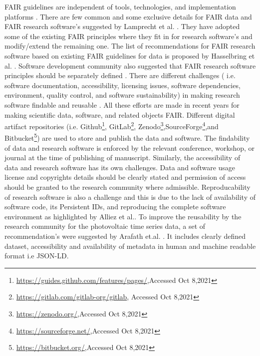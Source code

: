 \documentclass[preprint,12pt]{elsarticle}
\begin{document}
FAIR guidelines are independent of tools, technologies, and implementation platforms \cite{wilkinson2016FAIR}. There are few common and some exclusive details for FAIR data and FAIR research software’s suggested by Lamprecht et al. \cite{lamprecht2020towards}. They have adopted some of the existing FAIR principles where they fit in for research software’s and modify/extend the remaining one. The list of recommendations for FAIR research software based on existing FAIR guidelines for data is proposed by Hasselbring et al. \cite{hasselbring2020FAIR}. Software development community also suggested that FAIR research software principles should be separately defined \cite{gruenpeter2020m2}. There are different challenges ( i.e. software documentation, accessibility, licensing issues, software dependencies, environment, quality control, and software sustainability) in making research software findable and reusable \cite{org2020d2}.
All these efforts are made in recent years for making scientific data, software, and related objects FAIR. Different digital artifact repositories (i.e. Github\footnote{\url{https://guides.github.com/features/pages/},Accessed Oct 8,2021}, GitLab\footnote{\url{https://gitlab.com/gitlab-org/gitlab}, Accessed Oct 8,2021}, Zenodo\footnote{\url{https://zenodo.org/},Accessed Oct 8,2021},SourceForge\footnote{\url{https://sourceforge.net/},Accessed Oct 8,2021},and Bitbucket\footnote{\url{https://bitbucket.org/},Accessed Oct 8,2021}) are used to store and publish the data and software. %
The findability of data and research software is enforced by the relevant conference, workshop, or journal at the time of publishing of manuscript. Similarly, the accessibility of data and research software has its own challenges. Data and software usage license and copyrights details should be clearly stated and permission of access should be granted to the research community where admissible. Reproducability of research software is also a challenge and this is due to the lack of availability of software code, its Persistent IDs, and reproducing the complete software environment as highlighted by Alliez et al.\cite{alliez2019attributing}. To improve the reusability by the research community for the photovoltaic time series data, a set of recommendation's  were suggested by Arafath et.al. \cite{nihar2021toward}. It includes clearly defined dataset, accessibility and availability of metadata in human and machine readable format i.e JSON-LD. 
\end{document}
